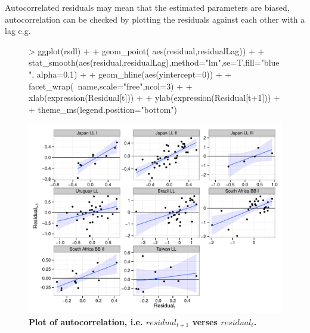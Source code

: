 \documentclass[shortnames,nojss,article]{jss}
\begin{document}
Autocorrelated residuals may mean that the estimated parameters are biased, autocorrelation can be checked by plotting the residuals against each other with a lag e.g.
\begin{figure}\begin{center}
\begin{Schunk}
\begin{Sinput}
> ggplot(rsdl)                                              +
+   geom_point( aes(residual,residualLag))                  +
+   stat_smooth(aes(residual,residualLag),method="lm",se=T,fill="blue", alpha=0.1)      +
+   geom_hline(aes(yintercept=0))                           +
+   facet_wrap(~name,scale="free",ncol=3)                   +
+   xlab(expression(Residual[t])) + 
+   ylab(expression(Residual[t+1])) +
+   theme_ms(legend.position="bottom")  
\end{Sinput}
\end{Schunk}
\includegraphics{diags-015}
\caption{\bf{Plot of autocorrelation, i.e. $residual_{t+1}$ verses $residual_{t}$.}}
\label{residual:3}
\end{center}
\end{figure}
\end{document}
